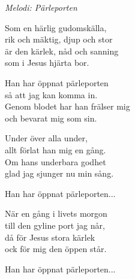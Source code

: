 {\footnotesize\textit{Melodi: Pärleporten}}\par
\vspace{10pt}
Som en härlig gudomskälla,\\
rik och mäktig, djup och stor\\
är den kärlek, nåd och sanning\\
som i Jesus hjärta bor.\par
\vspace{10pt}
Han har öppnat pärleporten\\
så att jag kan komma in.\\
Genom blodet har han frälser mig\\
och bevarat mig som sin.\par
\vspace{10pt}
Under över alla under,\\
allt förlat han mig en gång.\\
Om hans underbara godhet\\
glad jag sjunger nu min sång.\par
\vspace{10pt}
Han har öppnat pärleporten...\par
\vspace{10pt}
När en gång i livets morgon\\
till den gyline port jag når,\\
då för Jesus stora kärlek\\
ock för mig den öppen står.\par
\vspace{10pt}
Han har öppnat pärleporten...


